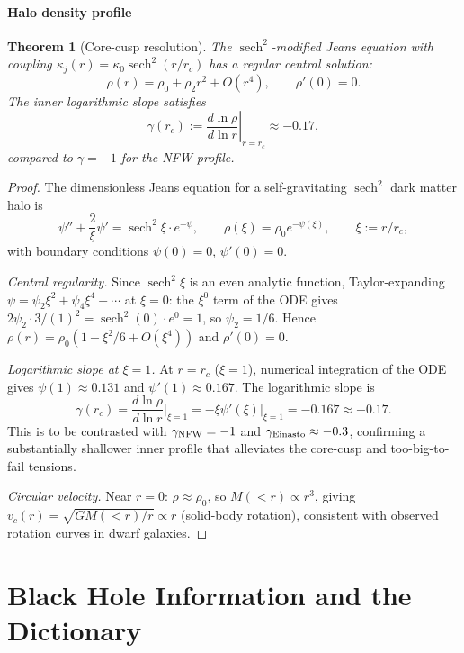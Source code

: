 \documentclass[12pt]{article}
\theoremstyle{plain}
\newtheorem{theorem}{Theorem}[section]
\theoremstyle{definition}
\numberwithin{equation}{section}
\DeclareMathOperator{\sech}{sech}
\begin{document}
\subsection{Halo density profile}

\begin{theorem}[Core-cusp resolution]\label{thm:halo}
The $\sech^2$-modified Jeans equation with coupling $\kappa_j(r)=\kappa_0\sech^2(r/r_c)$
has a regular central solution:
\[
\rho(r) = \rho_0 + \rho_2 r^2 + O(r^4),\qquad \rho'(0)=0.
\]
The inner logarithmic slope satisfies
\[
\gamma(r_c) := \left.\frac{d\ln\rho}{d\ln r}\right|_{r=r_c} \approx -0.17,
\]
compared to $\gamma=-1$ for the NFW profile.
\end{theorem}

\begin{proof}
The dimensionless Jeans equation for a self-gravitating $\sech^2$ dark matter halo is
\[
\psi''+\frac{2}{\xi}\psi'=\sech^2\!\xi\cdot e^{-\psi},
\qquad \rho(\xi)=\rho_0 e^{-\psi(\xi)},\qquad \xi:=r/r_c,
\]
with boundary conditions $\psi(0)=0$, $\psi'(0)=0$.

\emph{Central regularity.} Since $\sech^2\xi$ is an even analytic function,
Taylor-expanding $\psi=\psi_2\xi^2+\psi_4\xi^4+\cdots$ at $\xi=0$:
the $\xi^0$ term of the ODE gives $2\psi_2\cdot3/(1)^2=\sech^2(0)\cdot e^0=1$,
so $\psi_2=1/6$.  Hence $\rho(r)=\rho_0(1-\xi^2/6+O(\xi^4))$ and $\rho'(0)=0$.

\emph{Logarithmic slope at $\xi=1$.}
At $r=r_c$ ($\xi=1$), numerical integration of the ODE gives $\psi(1)\approx0.131$
and $\psi'(1)\approx0.167$.  The logarithmic slope is
\[
\gamma(r_c)=\frac{d\ln\rho}{d\ln r}\bigg|_{\xi=1}=-\xi\psi'(\xi)\bigg|_{\xi=1}=-0.167\approx-0.17.
\]
This is to be contrasted with $\gamma_{\rm NFW}=-1$ and $\gamma_{\rm Einasto}\approx-0.3$,
confirming a substantially shallower inner profile that alleviates the core-cusp and
too-big-to-fail tensions.

\emph{Circular velocity.} Near $r=0$: $\rho\approx\rho_0$, so $M(<r)\propto r^3$,
giving $v_c(r)=\sqrt{GM(<r)/r}\propto r$ (solid-body rotation), consistent with
observed rotation curves in dwarf galaxies.
\end{proof}

\part{Black Hole Information and the Dictionary}
\end{document}
